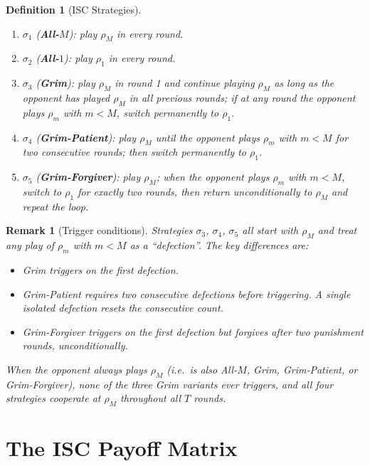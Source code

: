 \documentclass[12pt,a4paper]{article}
\newtheorem{definition}{Definition}[section]
\newtheorem{remark}{Remark}[section]
\begin{document}
\begin{definition}[ISC Strategies]\label{def:strats}
\hfill
\begin{enumerate}
  \item $\sigma_1$ (\textbf{All-$M$}): play $\rho_M$ in every round.
  \item $\sigma_2$ (\textbf{All-$1$}): play $\rho_1$ in every round.
  \item $\sigma_3$ (\textbf{Grim}): play $\rho_M$ in round 1 and continue
        playing $\rho_M$ as long as the opponent has played $\rho_M$ in all
        previous rounds; if at any round the opponent plays $\rho_m$ with
        $m<M$, switch permanently to $\rho_1$.
  \item $\sigma_4$ (\textbf{Grim-Patient}): play $\rho_M$ until the opponent
        plays $\rho_m$ with $m<M$ for \emph{two consecutive rounds}; then
        switch permanently to $\rho_1$.
  \item $\sigma_5$ (\textbf{Grim-Forgiver}): play $\rho_M$; when the opponent
        plays $\rho_m$ with $m<M$, switch to $\rho_1$ for \emph{exactly two
        rounds}, then return unconditionally to $\rho_M$ and repeat the loop.
\end{enumerate}
\end{definition}

\begin{remark}[Trigger conditions]\label{rem:triggers}
Strategies $\sigma_3$, $\sigma_4$, $\sigma_5$ all start with $\rho_M$ and
treat any play of $\rho_m$ with $m<M$ as a ``defection''.  The key differences
are:
\begin{itemize}
  \item Grim triggers on the \emph{first} defection.
  \item Grim-Patient requires \emph{two consecutive} defections before
        triggering.  A single isolated defection resets the consecutive count.
  \item Grim-Forgiver triggers on the first defection but forgives after two
        punishment rounds, unconditionally.
\end{itemize}
When the opponent always plays $\rho_M$ (i.e.\ is also All-$M$, Grim,
Grim-Patient, or Grim-Forgiver), \emph{none} of the three Grim variants ever
triggers, and all four strategies cooperate at $\rho_M$ throughout all $T$
rounds.
\end{remark}

\section{The ISC Payoff Matrix}
\label{sec:C}
\end{document}
